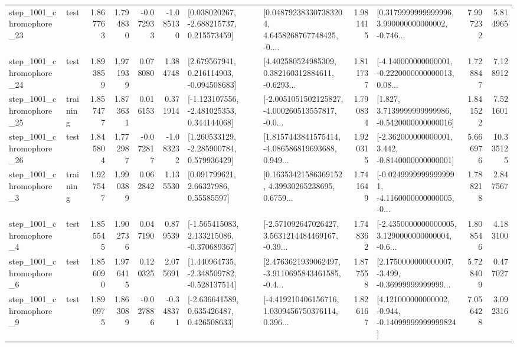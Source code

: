 \begin{tabular}{llrrrrllrlrr}
 step\_1001\_chromophore\_23 &      test &      1.867763 &    1.794830 &     -0.072933 & -1.085130 &    [0.038020267, -2.688215737, 0.215573459] &  [0.048792383307383204, 4.6458268767748425, -0.... &       1.981415 &  [0.3179999999999996, 3.990000000000002, -0.746... &            7.997232 &          5.814965 \\
 step\_1001\_chromophore\_24 &      test &      1.893859 &    1.971939 &      0.078080 &  1.384748 &    [2.679567941, 0.216114903, -0.094508683] &  [4.402580524985309, 0.382160312884611, -0.6293... &       1.811737 &  [-4.140000000000001, -0.2220000000000013, 0.08... &            1.728847 &          7.128912 \\
 step\_1001\_chromophore\_25 &  training &      1.857477 &    1.873631 &      0.016153 &  0.371914 &   [-1.123107556, -2.481025353, 0.344144068] &  [-2.0051051502125827, -4.000260513557817, -0.0... &       1.790834 &   [1.827, 3.7139999999999986, -0.5420000000000016] &            1.841522 &          7.521601 \\
 step\_1001\_chromophore\_26 &      test &      1.845804 &    1.772987 &     -0.072817 & -1.083232 &    [1.260533129, -2.285900784, 0.579936429] &  [1.8157443841575414, -4.086586819693688, 0.949... &       1.920315 &   [-2.362000000000001, 3.442, -0.8140000000000001] &            5.666976 &         10.335125 \\
  step\_1001\_chromophore\_3 &  training &      1.927547 &    1.990389 &      0.062842 &  1.135530 &       [0.091799621, 2.66327986, 0.55585597] &  [0.16353421586369152, 4.39930265238695, 0.6759... &       1.741649 &  [-0.02499999999999991, -4.1160000000000005, -0... &            1.788218 &          2.847567 \\
  step\_1001\_chromophore\_4 &      test &      1.855545 &    1.902736 &      0.047190 &  0.879539 &   [-1.565415083, 2.133215086, -0.370689367] &  [-2.571092647026427, 3.5631214484469167, -0.39... &       1.748362 &  [-2.4350000000000005, 3.1290000000000004, -0.6... &            1.808546 &          4.183100 \\
  step\_1001\_chromophore\_6 &      test &      1.856090 &    1.976415 &      0.120325 &  2.075691 &   [1.440964735, -2.348509782, -0.528137514] &  [2.4763621939062497, -3.9110695843461585, -0.4... &       1.877558 &  [2.1750000000000007, -3.499, -0.36999999999999... &            5.728409 &          0.477027 \\
  step\_1001\_chromophore\_9 &      test &      1.890975 &    1.863089 &     -0.027886 & -0.348371 &    [-2.636641589, 0.635426487, 0.426508633] &  [-4.419210406156716, 1.0309456750376114, 0.396... &       1.826167 &  [4.121000000000002, -0.944, -0.14099999999999824] &            7.056428 &          3.092316 \\

\end{tabular}
